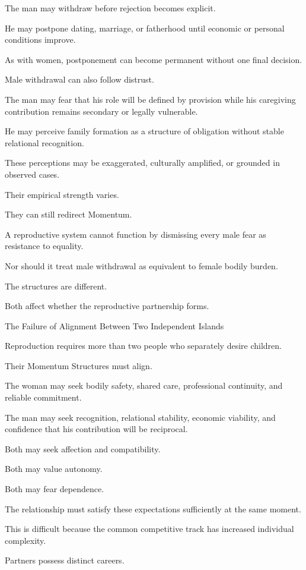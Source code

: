 The man may withdraw before rejection becomes explicit.

He may postpone dating, marriage, or fatherhood until economic or personal conditions improve.

As with women, postponement can become permanent without one final decision.

Male withdrawal can also follow distrust.

The man may fear that his role will be defined by provision while his caregiving contribution remains secondary or legally vulnerable.

He may perceive family formation as a structure of obligation without stable relational recognition.

These perceptions may be exaggerated, culturally amplified, or grounded in observed cases.

Their empirical strength varies.

They can still redirect Momentum.

A reproductive system cannot function by dismissing every male fear as resistance to equality.

Nor should it treat male withdrawal as equivalent to female bodily burden.

The structures are different.

Both affect whether the reproductive partnership forms.

The Failure of Alignment Between Two Independent Islands

Reproduction requires more than two people who separately desire children.

Their Momentum Structures must align.

The woman may seek bodily safety, shared care, professional continuity, and reliable commitment.

The man may seek recognition, relational stability, economic viability, and confidence that his contribution will be reciprocal.

Both may seek affection and compatibility.

Both may value autonomy.

Both may fear dependence.

The relationship must satisfy these expectations sufficiently at the same moment.

This is difficult because the common competitive track has increased individual complexity.

Partners possess distinct careers.

